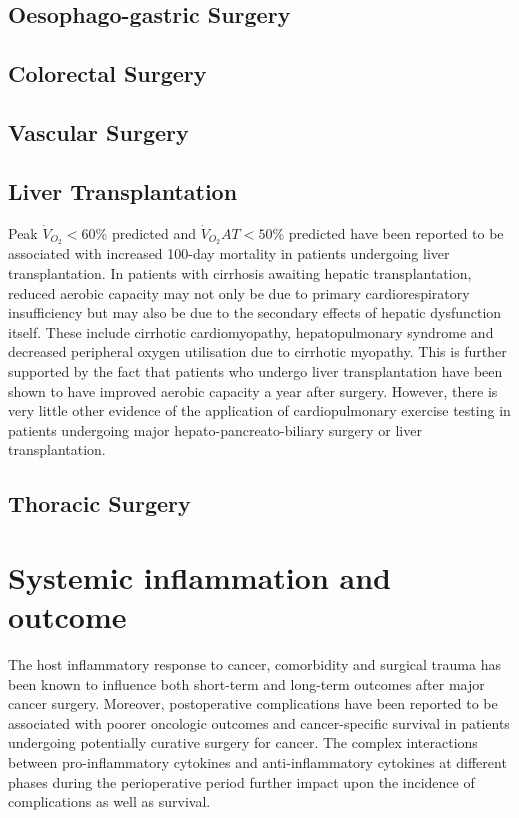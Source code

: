 \subsection{Oesophago-gastric Surgery}


\subsection{Colorectal Surgery}
\subsection{Vascular Surgery}
\subsection{Liver Transplantation}
Peak $\dot{V}_{O_2}<60\%$ predicted and $\dot{V}_{O_2}AT<50\%$ predicted have been reported to be associated with increased 100-day mortality in patients undergoing liver transplantation. In patients with cirrhosis awaiting hepatic transplantation, reduced aerobic capacity may not only be due to primary cardiorespiratory insufficiency but may also be due to the secondary effects of hepatic dysfunction itself. These include cirrhotic cardiomyopathy, hepatopulmonary syndrome and decreased peripheral oxygen utilisation due to cirrhotic myopathy.\parencite{epstein_aerobic_2004} This is further supported by the fact that patients who undergo liver transplantation have been shown to have improved aerobic capacity a year after surgery. \parencite{iscar_functional_2009} However, there is very little other evidence of the application of cardiopulmonary exercise testing in patients undergoing major hepato-pancreato-biliary surgery or liver transplantation.
\subsection{Thoracic Surgery}

\clearpage

\section{Systemic inflammation and outcome}
\label{sec:intro_systemic_inflammation_outcome}


The host inflammatory response to cancer, comorbidity and surgical trauma has been known to influence both short-term and long-term outcomes after major cancer surgery. Moreover, postoperative complications have been reported to be associated with poorer oncologic outcomes and cancer-specific survival in patients undergoing potentially curative surgery for cancer. The complex interactions between pro-inflammatory cytokines and anti-inflammatory cytokines at different phases during the perioperative period further impact upon the incidence of complications as well as survival.

